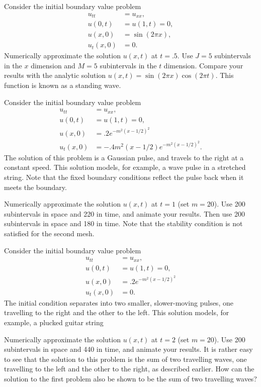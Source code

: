 \begin{problem}
	Consider the initial boundary value problem 
	\begin{align*}
		u_{tt} &= u_{xx}, \\
		u(0,t) &= u(1,t) = 0, \\
		u(x,0) &= \sin(2 \pi x),\\ 
		u_t(x,0) &= 0.
	\end{align*}
	Numerically approximate the solution $u(x,t)$ at $t = .5$.  Use $J=5$ subintervals in the $x$ dimension and $M=5$ subintervals in the $t$ dimension. %
	 Compare your results with the analytic solution $u(x,t) = \sin{(2 \pi x)} \cos{(2 \pi t)}.$  This function is known as a standing wave. 
\end{problem}



\begin{problem}
	Consider the initial boundary value problem 
	\begin{align*}
		u_{tt} &= u_{xx}, \\
		u(0,t) &= u(1,t) = 0, \\
		u(x,0) &= .2e^{-m^2(x-1/2)^2}\\ 
		u_t(x,0) &= -.4m^2(x-1/2)e^{-m^2(x-1/2)^2}.
	\end{align*}
	The solution of this problem is a Gaussian pulse, and travels to the right at a constant speed.  This solution models, for example, a wave pulse in a stretched string. Note that the fixed boundary conditions reflect the pulse back when it meets the boundary.
	
	Numerically approximate the solution $u(x,t)$ at $t = 1$ (set $m=20$).  Use 200 subintervals in space and 220 in time, and animate your results.  Then use 200 subintervals in space and 180 in time. Note that the stability condition is not satisfied for the second mesh. 
\end{problem}


\begin{problem}
	Consider the initial boundary value problem 
	\begin{align*}
		u_{tt} &= u_{xx}, \\
		u(0,t) &= u(1,t) = 0, \\
		u(x,0) &= .2e^{-m^2(x-1/2)^2}\\ 
		u_t(x,0) &= 0.
	\end{align*}
	The initial condition separates into two smaller, slower-moving pulses, one travelling to the right and the other to the left.   This solution models, for example, a plucked guitar string
	
	Numerically approximate the solution $u(x,t)$ at $t = 2$ (set $m=20$).  Use 200 subintervals in space and 440 in time, and animate your results.  It is rather easy to see that the solution to this problem is the sum of two travelling waves, one travelling to the left and the other to the right, as described earlier. How can the solution to the first problem also be shown to be the sum of two travelling waves? 
\end{problem}


